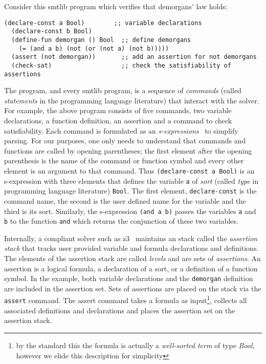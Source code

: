 Consider this \acl{smtlib} program
which verifies that demorgans' law holds:
%
\begin{lstlisting}[columns=flexible,keepspaces=true,language=SMTLIB]
  (declare-const a Bool)        ;; variable declarations
  (declare-const b Bool)
  (define-fun demorgan () Bool  ;; define demorgans
    (= (and a b) (not (or (not a) (not b)))))
  (assert (not demorgan))       ;; add an assertion for not demorgans
  (check-sat)                   ;; check the satisfiability of assertions
\end{lstlisting}
%
The program, and every \acl{smtlib} program, is a sequence of \emph{commands}
(called \emph{statements} in the programming language literature) that interact
with the solver. For example, the above program consists of five commands, two
variable declarations, a function definition, an assertion and a command to
check satisfiability. Each command is formulated as an
\emph{s-expressions}~\cite{10.1145/367177.367199} to simplify parsing. For our
purposes, one only needs to understand that commands and functions are called by
opening parentheses; the first element after the opening parenthesis is the name
of the command or function symbol and every other element is an argument to that
command. Thus \lstinline{(declare-const a Bool)} is an s-expression with three
elements that defines the \pl{} variable \lstinline{a} of \emph{sort} (called
\emph{type} in programming language literature) \lstinline{Bool}. The first
element, \lstinline{declare-const} is the command name, the second is the user
defined name for the variable and the third is its sort. Similarly, the
s-expression \lstinline{(and a b)} passes the variables \lstinline{a} and
\lstinline{b} to the function \lstinline{and} which returns the conjunction of
these two variables.

Internally, a compliant solver such as z3~\cite{10.1007/978-3-540-78800-3_24}
maintains an stack called the \emph{assertion stack} that tracks user provided
variable and formula declarations and definitions. The elements of the assertion
stack are called \emph{levels} and are sets of \emph{assertions}.
%
An assertion is a logical formula, a declaration of a sort, or a definition of a
function symbol. In the example, both variable declarations and the
\lstinline{demorgan} definition are included in the assertion set. Sets of
assertions are placed on the stack via the \lstinline{assert} command. The
assert command takes a formula as input\footnote{by the standard this the
  formula is actually a \emph{well-sorted term} of type \emph{Bool}, however we
  elide this description for simplicity}, collects all associated definitions
and declarations and places the assertion set on the assertion stack.

